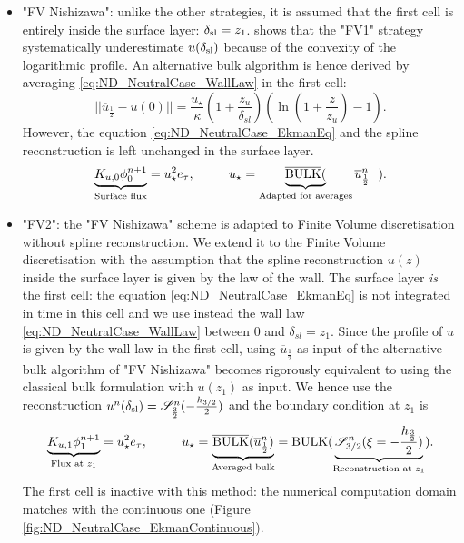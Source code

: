 \begin{itemize}
    \item "FV Nishizawa":  unlike the other strategies,
	    it is assumed that the first cell is entirely inside
		the surface layer: $\delta_{\rm sl} = z_{1}$.
		\cite{nishizawa_surface_2018} shows that the "FV1"
		strategy systematically underestimate
		$u(\delta_{\rm sl})$ because of the
	  convexity of the logarithmic profile.
	  An alternative bulk algorithm is hence derived by averaging
		\eqref{eq:ND_NeutralCase_WallLaw} in the first cell:
	\begin{equation}
		||\overline{u}_{\frac{1}{2}} - u(0)||
		= \frac{u_\star}{\kappa}
		\left(1+\frac{z_u}{\delta_{sl}}\right)
		\left(\ln(1+\frac{z}{z_u})-1\right).
	\end{equation}
	However, the equation \eqref{eq:ND_NeutralCase_EkmanEq}
	and the spline reconstruction is left unchanged in the
	surface layer.
		  \begin{equation}
		\underbrace{K_{u,0} \phi_0^{n+1}}_{\text{Surface flux}}
		= u_\star^2 e_\tau, ~~~~~~~~
			  u_\star = \underbrace{\overline{{\rm BULK}}(}_{
				  \text{Adapted for averages}}
			  \overline{u}^{n}_{\frac{1}{2}}~~).
		  \end{equation}
	\item "FV2": the "FV Nishizawa" scheme is adapted to
		Finite Volume discretisation without spline
		reconstruction. We extend it to the
		Finite Volume discretisation with the assumption
		that the spline reconstruction $u(z)$ inside
		the surface layer is given by the law of the wall.
	    The surface layer \textit{is} the first cell:
	    the equation \eqref{eq:ND_NeutralCase_EkmanEq}
	    is not integrated in time in this cell
	and we use instead the wall law
	\eqref{eq:ND_NeutralCase_WallLaw} between 0 and
		$\delta_{sl} = z_1$.
	Since the profile of $u$ is given by the wall law
	in the first cell,
	using $\overline{u}_{\frac{1}{2}}$ as input of
	the alternative bulk algorithm of "FV Nishizawa"
	becomes rigorously equivalent to using the
	classical bulk formulation with $u(z_1)$
	as input.
	We hence use the reconstruction
	$u^n(\delta_{\rm sl}) = {\cal S}^n_{\frac{3}{2}}(
	  -\frac{h_{3/2}}{2})$ and the boundary condition
		  at $z_1$ is
	  \begin{equation}
		\underbrace{K_{u,1} \phi_1^{n+1}}_{\text{Flux at } z_1}
		= u_\star^2 e_\tau, ~~~~~~~~
			  u_\star = \underbrace{\overline{{\rm BULK}}(
			  \overline{u}^{n}_{\frac{1}{2}})}_{
				  \text{Averaged bulk}
			  } = {\rm BULK}(
			\underbrace{{\cal S}_{3/2}^{n}
			(\xi=-\frac{h_{\frac{3}{2}}}{2})}_{
				\text{Reconstruction at }
			z_{1}}).
		  \end{equation}
	The first cell is inactive with this method:
	the numerical computation domain matches with the continuous
	one (Figure \ref{fig:ND_NeutralCase_EkmanContinuous}).
  \end{itemize}
